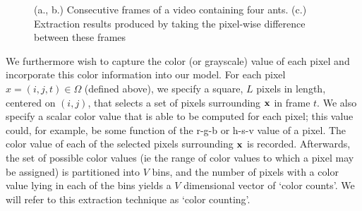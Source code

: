 \documentclass[smallcondensed, final]{svjour3}
\newcommand{\willie}[1]{\textcolor{green}{\textsf{\emph{\textbf{\textcolor{green}{#1}}}}}}
\begin{document}

\begin{figure}
  \centering
  \caption{(a., b.) Consecutive frames of a video containing four ants. (c.) Extraction results produced by taking the pixel-wise difference between these frames}
  \label{fig:img_and_framediff}
\end{figure}

We furthermore wish to capture the color (or grayscale) value of each pixel and incorporate this color information into our model. For each pixel $x = (i, j, t) \in \Omega$ (defined above), we specify a square, $L$ pixels in length, centered on $(i, j)$, that selects a set of pixels surrounding $\bold{x}$ in frame $t$. We also specify a scalar color value that is able to be computed for each pixel; this value could, for example, be some function of the r-g-b or h-s-v value of a pixel. The color value of each of the selected pixels surrounding $\bold{x}$ is recorded. Afterwards, the set of possible color values (ie the range of color values to which a pixel may be assigned) is partitioned into $V$ bins, and the number of pixels with a color value lying in each of the bins yields a $V$ dimensional vector of `color counts'. We will refer to this extraction technique as `color counting'.
\end{document}
